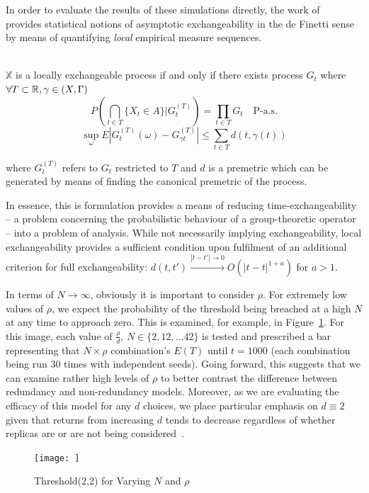In order to evaluate the results of these simulations directly, the work of~\cite{campbell2020local} provides statistical notions of asymptotic exchangeability in the de Finetti sense by means of quantifying \textit{local} empirical measure sequences.

\begin{definition}
    \\
    $\mathbb{X}$ is a locally exchangeable process if and only if there exists process $G_{t}$ where $\forall T \subset \mathbb{R}, \gamma \in \text(X,\Gamma) $
    \[P\left(\bigcap_{t \in T} \{X_{t} \in A\} | G^{(T)}_{t} \right) = \prod_{t \in T} G_{t} \quad \text{P-a.s.}\]
    \[\sup_{\omega}E|G^{(T)}_{t} (\omega)-G^{(T)}_{\gamma t}| \leq \sum_{t \in T} d(t, \gamma(t))\]

    where $G^{(T)}_{t}$ refers to $G_{t}$ restricted to $T$ and $d$ is a premetric which can be generated by means of finding the canonical premetric of the process.
\end{definition}
In essence, this is formulation provides a means of reducing time-exchangeability -- a problem concerning the probabilistic behaviour of a group-theoretic operator -- into a problem of analysis. While not necessarily implying exchangeability, local exchangeability provides a sufficient condition upon fulfilment of an additional criterion for full exchangeability: $d(t,t') \overset{|t-t'|\rightarrow 0}\rightarrow O(|t-t|^{1+a})$ for $a>1$.

In terms of $N \rightarrow \infty$, obviously it is important to consider $\rho$. For extremely low values of $\rho$, we expect the probability of the threshold being breached at a high $N$ at any time to approach zero. This is examined, for example, in Figure~\ref{fig:img1}. For this image, each value of $\frac{\rho}{d}$, $N \in \{2, 12, \dots 42\}$ is tested and prescribed a bar representing that $N \times \rho$ combination's $E(T)$ until $t=1000$ (each combination being run 30 times with independent seeds). Going forward, this suggests that we can examine rather high levels of $\rho$ to better contrast the difference between redundancy and non-redundancy models. Moreover, as we are evaluating the efficacy of this model for any $d$ choices, we place particular emphasis on $d \equiv 2$ given that returns from increasing $d$ tends to decrease regardless of whether replicas are or are not being considered~\cite{gardner_redundancy-d_2017,power}.
\begin{figure}
    \centering
    \texttt{[image: ]} %
    \caption{Threshold(2,2) for Varying $N$ and $\rho$}
    \label{fig:img1}
\end{figure}

